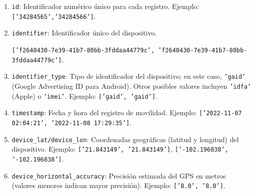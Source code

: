 \begin{enumerate}[leftmargin=*, align=left, noitemsep]
    \item \texttt{id}: Identificador numérico único para cada registro. Ejemplo: \texttt{['34284565','34284566']}.
    \item \texttt{identifier}: Identificador único del dispositivo.  
    \begin{small}
    \texttt{['f2640430-7e39-41b7-80bb-3fddaa44779c', 'f2640430-7e39-41b7-80bb-3fddaa44779c']}.
    \end{small}

    \item \texttt{identifier\_type}: Tipo de identificador del dispositivo; en este caso, \texttt{'gaid'} (Google Advertising ID para Android). Otros posibles valores incluyen \texttt{'idfa'} (Apple) o \texttt{'imei'}.  
    Ejemplo: \texttt{['gaid', 'gaid']}.

    \item \texttt{timestamp}: Fecha y hora del registro de movilidad.  
    Ejemplo: \texttt{['2022-11-07 02:04:21', '2022-11-08 17:29:35']}.

    \item \texttt{device\_lat/device\_lon}: Coordenadas geográficas (latitud y longitud) del dispositivo.  
    Ejemplo: \texttt{['21.843149', '21.843149']}, \texttt{['-102.196838', '-102.196838']}.


    \item \texttt{device\_horizontal\_accuracy}: Precisión estimada del GPS en metros (valores menores indican mayor precisión).  
    Ejemplo: \texttt{['8.0', '8.0']}.

\end{enumerate}

